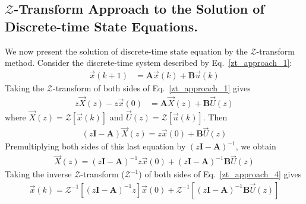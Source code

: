 \documentclass[12pt,a4paper,oneside]{book}
\begin{document}
\begin{onehalfspace}
\subsection{$\mathbf{\mathcal{Z}}$-Transform Approach to the Solution of 
	Discrete-time State Equations.} We now present the solution of 
	discrete-time 
state 
equation 
by the $\mathcal{Z}$-transform method. Consider the discrete-time system 
described by 
Eq.~\eqref{zt_approach_1}:
\begin{equation}\label{zt_approach_1}
	\begin{aligned}
		\vec{x}(k+1) &= \mathbf{A}\vec{x}(k)+\mathbf{B}\vec{u}(k)
	\end{aligned}
\end{equation}
Taking the $\mathcal{Z}$-transform of both sides of Eq.~\eqref{zt_approach_1} 
gives
\begin{equation}\label{zt_approach_2}
	\begin{aligned}
		z{\vec{X}}(z) -z\vec{x}(0) &= 
		\mathbf{A}{\vec{X}}(z)+\mathbf{B}{\vec{U}}(z)
	\end{aligned}
\end{equation}
where ${\vec{X}}(z) = \mathcal{Z}\left[ \vec{x}(k)\right]$ and ${\vec{U}}(z) 
= \mathcal{Z}\left[ \vec{u}(k)\right]$. Then
\begin{equation}\label{zt_approach_3}
	\begin{aligned}
		\left( z\mathbf{I}-\mathbf{A}\right){\vec{X}}(z) = z\vec{x}(0) + 
		\mathbf{B}{\vec{U}}(z)
	\end{aligned}
\end{equation}
Premultiplying both sides of this last equation by $\left( 
z\mathbf{I}-\mathbf{A}\right)^{-1}$, we obtain 
\begin{equation}\label{zt_approach_4}
	\begin{aligned}
		{\vec{X}}(z) = \left( z\mathbf{I}-\mathbf{A}\right)^{-1}z 
		\vec{x}(0)+\left( 
		z\mathbf{I}-\mathbf{A}\right)^{-1}\mathbf{B}{\vec{U}}(z)
	\end{aligned}
\end{equation}
Taking the inverse $\mathcal{Z}$-transform ($\mathcal{Z}^{-1}$) of both sides 
of Eq.~\eqref{zt_approach_4} gives
\begin{equation}\label{zt_approach_5}
	\begin{aligned}
		\vec{x}(k) = \mathcal{Z}^{-1}\left[ \left( 
		z\mathbf{I}-\mathbf{A}\right)^{-1}z\right] 
		\vec{x}(0)+\mathcal{Z}^{-1}\left[ \left( 
		z\mathbf{I}-\mathbf{A}\right)^{-1}\mathbf{B}{\vec{U}}(z)\right] 
	\end{aligned}

\end{equation}
\end{onehalfspace}
\end{document}
